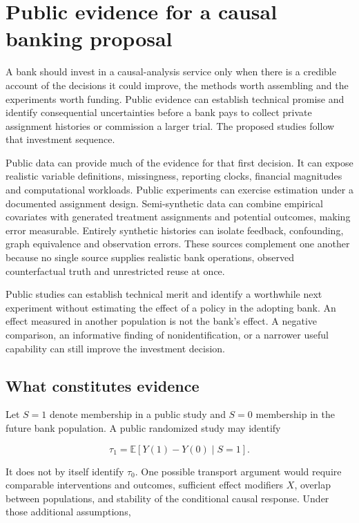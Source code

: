 \hypertarget{pd15:evidence}{%
\chapter{Public evidence for a causal banking
proposal}\label{pd15:evidence}}

A bank should invest in a causal-analysis service only when there is a
credible account of the decisions it could improve, the methods worth
assembling and the experiments worth funding. Public evidence can establish
technical promise and identify consequential uncertainties before a bank
pays to collect private assignment histories or commission a larger trial.
The proposed studies follow that investment sequence.

Public data can provide much of the evidence for that first decision. It
can expose realistic variable definitions, missingness, reporting
clocks, financial magnitudes and computational workloads. Public
experiments can exercise estimation under a documented assignment
design. Semi-synthetic data can combine empirical covariates with
generated treatment assignments and potential outcomes, making error
measurable. Entirely synthetic histories can isolate feedback,
confounding, graph equivalence and observation errors. These sources
complement one another because no single source supplies realistic bank
operations, observed counterfactual truth and unrestricted reuse at
once.

Public studies can establish technical merit and identify a worthwhile
next experiment without estimating the effect of a policy in the adopting
bank. An effect measured in another population is not the bank's effect.
A negative comparison, an informative finding of nonidentification, or a
narrower useful capability can still improve the investment decision.

\hypertarget{what-constitutes-evidence}{%
\section{What constitutes evidence}\label{what-constitutes-evidence}}

Let \(S=1\) denote membership in a public study and \(S=0\) membership
in the future bank population. A public randomized study may identify

\[
\tau_1=\mathbb E[Y(1)-Y(0)\mid S=1].
\]

It does not by itself identify \(\tau_0\). One possible transport
argument would require comparable interventions and outcomes, sufficient
effect modifiers \(X\), overlap between populations, and stability of
the conditional causal response. Under those additional assumptions,

